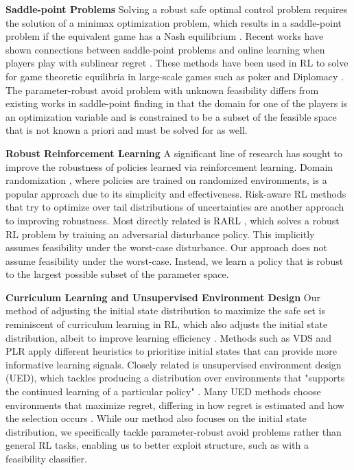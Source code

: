 \documentclass{article} %
\begin{document}
\textbf{Saddle-point Problems } 
Solving a robust safe optimal control problem requires the solution of a minimax optimization problem, which results in a saddle-point problem if the equivalent game has a Nash equilibrium \citep{orabona2019modern}.
Recent works have shown connections between saddle-point problems and online learning when players play with sublinear regret \citep{orabona2019modern}.
These methods have been used in RL to solve for game theoretic equilibria in large-scale games such as poker \citep{brown2019deep} and Diplomacy \citep{gray2020human}.
The parameter-robust avoid problem with unknown feasibility differs from existing works in saddle-point finding in that the domain for one of the players is an optimization variable and is constrained to be a subset of the feasible space that is not known a priori and must be solved for as well.

\textbf{Robust Reinforcement Learning } 
A significant line of research has sought to improve the robustness of policies learned via reinforcement learning.
Domain randomization \citep{tobin2017domain}, where policies are trained on randomized environments, is a popular approach due to its simplicity and effectiveness.
Risk-aware RL methods that try to optimize over tail distributions of uncertainties \citep{yang2021wcsac,stachowicz2024racer} are another approach to improving robustness.
Most directly related is RARL \citep{pinto2017robust}, which solves a robust RL problem by training an adversarial disturbance policy. This implicitly assumes feasibility under the worst-case disturbance. Our approach does not assume feasibility under the worst-case. Instead, we learn a policy that is robust to the largest possible subset of the parameter space.


\textbf{Curriculum Learning and Unsupervised Environment Design } 
Our method of adjusting the initial state distribution to maximize the safe set is reminiscent of curriculum learning in RL,
which also adjusts the initial state distribution, albeit to improve learning efficiency \citep{narvekar2020curriculum}.
Methods such as VDS \citep{zhang2020automatic} and PLR \citep{jiang2021prioritized} apply different heuristics to prioritize initial states that can provide more informative learning signals.
Closely related is unsupervised environment design (UED), which tackles producing a distribution over environments that "supports the continued learning of a particular policy" \citep{dennis2020emergent}.
Many UED methods choose environments that maximize regret, differing in how regret is estimated and how the selection occurs \citep{dennis2020emergent,jiang2021replay,lanier_feasible_2022,parker2022evolving,rutherford_no_nodate}.
While our method also focuses on the initial state distribution, we specifically tackle parameter-robust avoid problems rather than general RL tasks, enabling us to better exploit structure, such as with a feasibility classifier.
\end{document}
